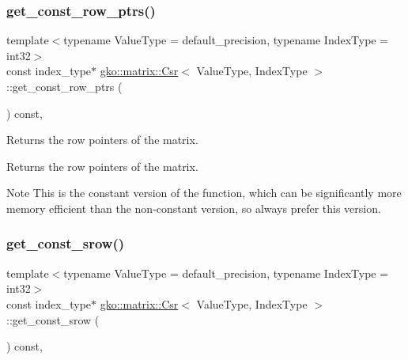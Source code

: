 \subsubsection{\texorpdfstring{get\+\_\+const\+\_\+row\+\_\+ptrs()}{get\_const\_row\_ptrs()}}
{\footnotesize\ttfamily template$<$typename Value\+Type = default\+\_\+precision, typename Index\+Type = int32$>$ \\
const index\+\_\+type$\ast$ \hyperlink{classgko_1_1matrix_1_1Csr}{gko\+::matrix\+::\+Csr}$<$ Value\+Type, Index\+Type $>$\+::get\+\_\+const\+\_\+row\+\_\+ptrs (\begin{DoxyParamCaption}{ }\end{DoxyParamCaption}) const\hspace{0.3cm}{\ttfamily [inline]}, {\ttfamily [noexcept]}}



Returns the row pointers of the matrix. 

\begin{DoxyReturn}{Returns}
the row pointers of the matrix.
\end{DoxyReturn}
\begin{DoxyNote}{Note}
This is the constant version of the function, which can be significantly more memory efficient than the non-\/constant version, so always prefer this version. 
\end{DoxyNote}
\mbox{\label{classgko_1_1matrix_1_1Csr_ac046f27c47848bf31c9234567661ef48}} 
\subsubsection{\texorpdfstring{get\+\_\+const\+\_\+srow()}{get\_const\_srow()}}
{\footnotesize\ttfamily template$<$typename Value\+Type = default\+\_\+precision, typename Index\+Type = int32$>$ \\
const index\+\_\+type$\ast$ \hyperlink{classgko_1_1matrix_1_1Csr}{gko\+::matrix\+::\+Csr}$<$ Value\+Type, Index\+Type $>$\+::get\+\_\+const\+\_\+srow (\begin{DoxyParamCaption}{ }\end{DoxyParamCaption}) const\hspace{0.3cm}{\ttfamily [inline]}, {\ttfamily [noexcept]}}



